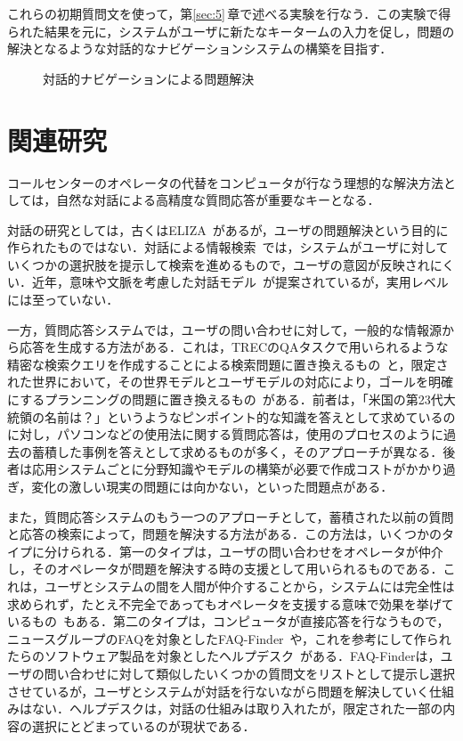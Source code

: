これらの初期質問文を使って，第\ref{sec:5}\,章で述べる実験を行なう．この実験で得られた結果を元に，システムがユーザに新たなキータームの入力を促し，問題の解決となるような対話的なナビゲーションシステムの構築を目指す．

\begin{figure}[t]
 \begin{center}
 \end{center}
  \caption{対話的ナビゲーションによる問題解決}
  \label{fig:navi}
\end{figure}


\section{関連研究}\label{sec:3}
コールセンターのオペレータの代替をコンピュータが行なう理想的な解決方法としては，自然な対話による高精度な質問応答が重要なキーとなる．

対話の研究としては，古くはELIZA~\cite{eliza}があるが，ユーザの問題解決という目的に作られたものではない．対話による情報検索~\cite{oddy}では，システムがユーザに対していくつかの選択肢を提示して検索を進めるもので，ユーザの意図が反映されにくい．近年，意味や文脈を考慮した対話モデル~\cite{katou,iida}が提案されているが，実用レベルには至っていない．

一方，質問応答システムでは，ユーザの問い合わせに対して，一般的な情報源から応答を生成する方法がある．これは，TRECのQAタスクで用いられるような精密な検索クエリを作成することによる検索問題に置き換えるもの~\cite{sanda,sanda2}と，限定された世界において，その世界モデルとユーザモデルの対応により，ゴールを明確にするプランニングの問題に置き換えるもの~\cite{allen}がある．前者は，「米国の第23代大統領の名前は？」というようなピンポイント的な知識を答えとして求めているのに対し，パソコンなどの使用法に関する質問応答は，使用のプロセスのように過去の蓄積した事例を答えとして求めるものが多く，そのアプローチが異なる．後者は応用システムごとに分野知識やモデルの構築が必要で作成コストがかかり過ぎ，変化の激しい現実の問題には向かない，といった問題点がある．

また，質問応答システムのもう一つのアプローチとして，蓄積された以前の質問と応答の検索によって，問題を解決する方法がある．この方法は，いくつかのタイプに分けられる．第一のタイプは，ユーザの問い合わせをオペレータが仲介し，そのオペレータが問題を解決する時の支援として用いられるものである．これは，ユーザとシステムの間を人間が仲介することから，システムには完全性は求められず，たとえ不完全であってもオペレータを支援する意味で効果を挙げているもの~\cite{yanase}もある．第二のタイプは，コンピュータが直接応答を行なうもので， ニュースグループのFAQを対象としたFAQ-Finder~\cite{bruke}や，これを参考にして作られたらのソフトウェア製品を対象としたヘルプデスク~\cite{kurohashi}がある．FAQ-Finderは，ユーザの問い合わせに対して類似したいくつかの質問文をリストとして提示し選択させているが，ユーザとシステムが対話を行ないながら問題を解決していく仕組みはない．ヘルプデスクは，対話の仕組みは取り入れたが，限定された一部の内容の選択にとどまっているのが現状である．

